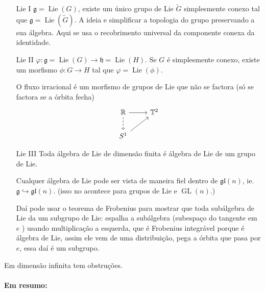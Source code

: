 \begin{thm}\leavevmode
	\begin{enumerate}
		\item[Lie I] $\mathfrak{g} =\operatorname{Lie}(G)$, existe um \'unico grupo de Lie $\tilde{G}$ simplesmente conexo tal que $\mathfrak{g} =\operatorname{Lie}(\tilde{G})$. A ideia e simplificar a topologia do grupo preservando a sua \'algebra. Aqui se usa o recobrimento universal da componente conexa da identidade.
	
		\item[Lie II] $\varphi:\mathfrak{g} =\operatorname{Lie}(G)\to \mathfrak{h} =\operatorname{Lie}(H)$. Se $G$ \'e simplesmente conexo, existe um morfismo $\phi:G\to H$ tal que $\varphi =\operatorname{Lie}(\phi)$.

			\begin{example}
				O fluxo irracional  \'e um morfismo de grupos de Lie que n\~ao se factora (s\'o se factora se a \'orbita fecha)
				\[\begin{tikzcd}
				\mathbb{R}\arrow[r]\arrow[d,dashed,swap]&\mathbb{T}^2\\
				S^1\arrow[ur]
				\end{tikzcd}\]
			\end{example}

		\item[Lie III] Toda \'algebra de Lie de dimens\~ao finita \'e \'algebra de Lie de um grupo de Lie.

			\begin{thm}[Ado]\leavevmode
				Cualquer \'algebra de Lie pode ser vista de maneira fiel dentro de $\mathfrak{gl}(n)$, ie. $\mathfrak{g} \hookrightarrow \mathfrak{gl}(n)$. (isso no acontece para grupos de Lie e $\operatorname{GL}(n)$.)
			\end{thm}
			Da\'i pode usar o teorema de Frobenius para mostrar que toda sub\'algebra de Lie da um subgrupo de Lie: espalha a sub\'algebra (subespaço do tangente em $e$ ) usando multiplica\c c\~ao a esquerda, que \'e Frobenius integr\'avel porque \'e \'algebra de Lie, assim ele vem de uma distribui\c c\~ao, pega a \'orbita que pasa por $e$, essa da\'i \'e um subgrupo.
	\end{enumerate}
\end{thm}

\begin{remark}
	Em dimens\~ao infinita tem obstru\c c\~oes.
\end{remark}

\paragraph{Em resumo:}

